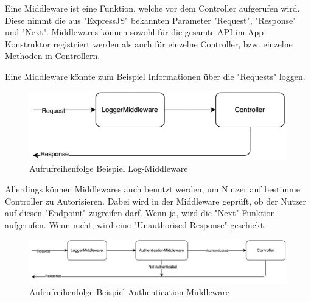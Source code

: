 Eine Middleware ist eine Funktion, welche vor dem Controller aufgerufen wird. Diese nimmt die aus "ExpressJS" bekannten Parameter "Request", "Response" und "Next". Middlewares können sowohl für die gesamte API im App-Konstruktor registriert werden als auch für einzelne Controller, bzw. einzelne Methoden in Controllern.

Eine Middleware könnte zum Beispiel Informationen über die "Requests" loggen. 

\begin{figure}[h]
    \centering
    \includegraphics{media/APITemplate/LogMiddleware.png}
    \caption{Aufrufreihenfolge Beispiel Log-Middleware} 
\end{figure}

Allerdings können Middlewares auch benutzt werden, um Nutzer auf bestimme Controller zu Autorisieren. Dabei wird in der Middleware geprüft, ob der Nutzer auf diesen "Endpoint" zugreifen darf. Wenn ja, wird die "Next"-Funktion aufgerufen. Wenn nicht, wird eine "Unauthorised-Response" geschickt.

\begin{figure}[h]
    \centering
    \includegraphics{media/APITemplate/AuthMiddleware.png}
    \caption{Aufrufreihenfolge Beispiel Authentication-Middleware} 
\end{figure}